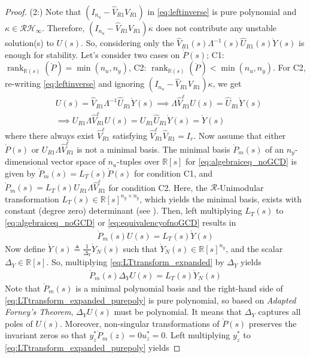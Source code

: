 \documentclass[10pt,a4paper]{amsart}
\theoremstyle{remark}
\DeclareMathOperator*{\rank}{rank}
\begin{document}
\begin{proof}
(2:) Note that $(I_{n_u}-\hat{V}_{R1}{V}_{R1})$ in \eqref{eq:leftinverse} is pure polynomial and $\kappa \in \mathcal{R}\mathcal{H}_\infty$. Therefore, $(I_{n_u}-\hat{V}_{R1}{V}_{R1})\kappa$ does not contribute any unstable solution(s) to $U(s)$. So, considering only the $\hat{V}_{R1}(s)\Lambda^{-1}(s)\hat{U}_{R1}(s)\grave{Y}(s)$ is enough for stability. Let's consider two cases on $\grave{P}(s)$; C1: $\rank_{\mathbb{R}(s)}(\grave{P})=\min(n_u,n_y)$, C2: $\rank_{\mathbb{R}(s)}(\grave{P})<\min(n_u,n_y)$. 
For C2, re-writing \eqref{eq:leftinverse} and ignoring $(I_{n_u}-\hat{V}_{R1}{V}_{R1})\kappa$, we get
\begin{align}
    &U(s)=\hat{V}_{R1}\Lambda^{-1}\hat{U}_{R1}\grave{Y}(s) \implies
    \Lambda\hat{V}^\ell_{R1}U(s)=\hat{U}_{R1}\grave{Y}(s)\nonumber \\
    &\implies U_{R1}\Lambda\hat{V}^\ell_{R1} U(s)=U_{R1}\hat{U}_{R1}\grave{Y}(s) = \grave{Y}(s) \label{eq:equivalencyofnoGCD}
\end{align}
where there always exist $\hat{V}^\ell_{R1}$ satisfying $\hat{V}^\ell_{R1}\hat{V}_{R1}=I_r$. Now assume that either $\grave{P}(s)$ or $U_{R1}\Lambda\hat{V}_{R1}^\ell$ is not a minimal basis. The minimal basis \( \grave{P}_m(s) \) of an \( n_y \)-dimensional vector space of \( n_u \)-tuples over \( \mathbb{R}[s] \) for \eqref{eq:algebraiceq_noGCD} is given by \( \grave{P}_m(s) = L_T(s)\grave{P}(s) \) for condition C1, and \( \grave{P}_m(s) = L_T(s)U_{R1}\Lambda\hat{V}_{R1}^\ell \) for condition C2. Here, the \( \mathcal{R}\)-Unimodular transformation \( L_T(s) \in \mathbb{R}[s]^{n_y \times n_y} \), which yields the minimal basis, exists with constant (degree zero) determinant (see \cite[Remark 2]{forney1975minimal}). Then, left multiplying $L_T(s)$ to \eqref{eq:algebraiceq_noGCD} or \eqref{eq:equivalencyofnoGCD} results in
\begin{align} \label{eq:LTtransform_expanded}
 \grave{P}_m(s)U(s)=L_T(s)\grave{Y}(s)
\end{align}
\noindent Now define $\grave{Y}(s) \triangleq \frac{1}{\Delta_Y}{\grave{Y}_N}(s)$ such that $\grave{Y}_N(s) \in \mathbb{R}[s]^{n_y}$, and the scalar $\Delta_Y \in \mathbb{R}[s]$. So, multiplying \eqref{eq:LTtransform_expanded} by $\Delta_Y$ yields
\begin{align} \label{eq:LTtransform_expanded_purepoly}
\grave{P}_m(s)\Delta_YU(s)=L_T(s)\grave{Y}_N(s)
\end{align}
Note that $\grave{P}_m(s)$ is a minimal polynomial basis and the right-hand side of \eqref{eq:LTtransform_expanded_purepoly} is pure polynomial, so based on \textit{Adapted Forney's Theorem}, $\Delta_YU(s)$ must be polynomial. It means that $\Delta_Y$ captures all poles of $U(s)$. Moreover, non-singular transformations of $\grave{P}(s)$ preserves the invariant zeros \cite{misra1994computation} so that $y^*_z\grave{P}_m(z)=0u^*_z=0$. Left multiplying $y^*_z$ to \eqref{eq:LTtransform_expanded_purepoly} yields

\end{proof}
\end{document}
